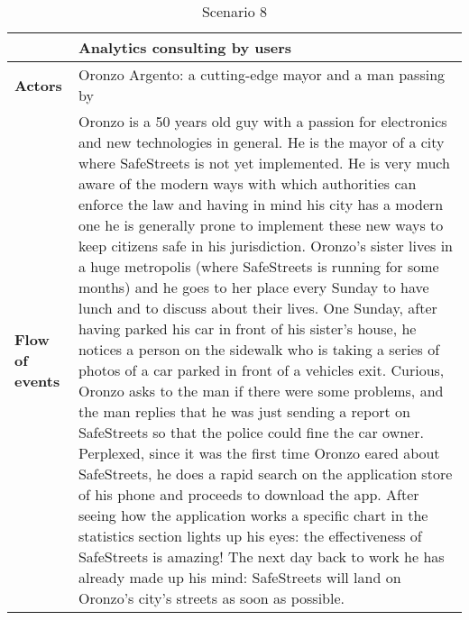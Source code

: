 \begin{table}[!htbp]
	\centering
\begin{tabular}{lp{9cm}}
\hline
\bf\large  &\bf\large Analytics consulting by users\\
\hline
\hline

\bf Actors&Oronzo Argento: a cutting-edge mayor and a man passing by \\
\hline
\bf Flow of events&
Oronzo is a 50 years old guy with a passion for electronics and new technologies in general. He is the mayor of a city where SafeStreets is not yet implemented. He is very much aware of the modern ways with which authorities can enforce the law and having in mind his city has a modern one he is generally prone to implement these new ways to keep citizens safe in his jurisdiction.
Oronzo's sister lives in a huge metropolis (where SafeStreets is running for some months) and he goes to her place every Sunday to have lunch and to discuss about their lives. One Sunday, after having parked his car in front of his sister's house, he notices a person on the sidewalk who is taking a series of photos of a car parked in front of a vehicles exit. Curious, Oronzo asks to the man if there were some problems, and the man replies that he was just sending a report on SafeStreets so that the police could fine the car owner. Perplexed, since it was the first time Oronzo eared about SafeStreets, he does a rapid search on the application store of his phone and proceeds to download the app. After seeing how the application works a specific chart in the statistics section 
lights up his eyes: the effectiveness of SafeStreets is amazing! The next day back to work he has already made up his mind: SafeStreets will land on Oronzo's city's streets as soon as possible.
\end{tabular}
\caption{Scenario 8} 
\label{tab:scenarioeight}
\end{table}